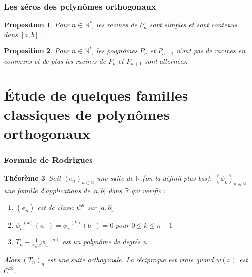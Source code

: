 \documentclass[xcolor=dvipsnames,10pt,mathserif]{beamer}
\theoremstyle{plain}
\newtheorem{thm}{Th\'eor\`eme}%
\newtheorem{pro}[thm]{Proposition}%
\newcommand{\R}{\mathbb{R}}
\newcommand{\N}{\mathbb{N}}
\begin{document}
\begin{frame} \frametitle{Les zéros des polynômes orthogonaux \hfill \insertpagenumber}

\begin{pro}
Pour $ n \in \N^* $, les racines de $P_n$ sont simples et sont contenus dans $[a,b]$.
\end{pro}

\pause

\begin{pro}
Pour $ n \in \N^* $, les polynômes $P_n$ et $P_{n+1}$ n'ont pas de racines en communs et de plus les racines de $P_n$ et $P_{n+1}$ sont alternées.
\end{pro}

\end{frame}
  \section{\'{E}tude de quelques familles classiques de polynômes orthogonaux}

\begin{frame}\frametitle{Formule de Rodrigues \hfill \insertpagenumber}
\begin{thm}
Soit $(e_n)_{ n \in \N } $ une suite de $\R$ (on la définit plus bas), $(\phi_n)_{ n \in \N }$ une famille d'applications de $]a, b[$ dans $\mathbb{R}$ qui vérifie :
\begin{enumerate}
\item $ (\phi_n)$ est de classe $C^n$ sur $]a, b[$
\item $ {\phi_n}^{(k)} (a^+) = {\phi_n}^{(k)} (b^-) = 0$ pour $ 0 \leqslant k \leqslant n-1$
\item $ T_n \equiv \frac{1}{ e_n w}{{\phi_n}^{(n)}}$ est un polynôme de degrés n.
\end{enumerate}
Alors $(T_n)_n$ est une suite orthogonale.
La réciproque est vraie quand $w(x)$ est $C^\infty$.
\end{thm}
\end{frame}
\end{document}
